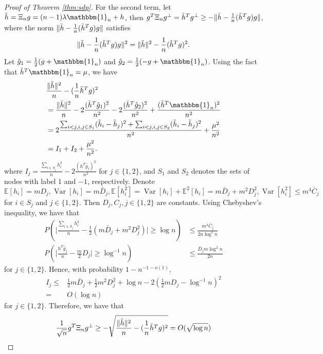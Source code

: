 \documentclass[conference]{IEEEtran}
\DeclarePairedDelimiter\norm{\lVert}{\rVert}
\DeclareMathOperator{\Var}{Var}
\begin{document}
\begin{proof}[Proof of Theorem \ref{thm:sdp}]
	For the second term, let $\tilde{h}=\Xi_n g
	=(n-1)\lambda\mathbbm{1}_n+h$, then
	$g^T \Xi_n g^{\perp} = \tilde{h}^T g^{\perp} \geq -\norm{\tilde{h}-\frac{1}{n}(\tilde{h}^Tg)g}$, where the  norm $\norm{\tilde{h}-\frac{1}{n}(\tilde{h}^Tg)g}$ satisfies
	\begin{align*}
		\norm{\tilde{h}-\frac{1}{n}(\tilde{h}^Tg)g}^2
		=\norm{\tilde{h}}^2 - \frac{1}{n}(\tilde{h}^Tg)^2.
	\end{align*}
	Let $\hat{g}_1 = \frac{1}{2}(g + \mathbbm{1}_n)$ and $\hat{g}_2 = \frac{1}{2}(-g +\mathbbm{1}_n)$.
	Using the fact that $\tilde{h}^T\mathbbm{1}_n=\mu$, we have 
	\begin{align*} 
		&\frac{\norm{\tilde{h}}^2}{n} - (\frac{1}{n}\tilde{h}^Tg)^2\\
		&=\frac{\norm{\tilde{h}}^2}{n} - 2\frac{(\tilde{h}^T \hat{g}_1)^2}{n^2} - 2\frac{(\tilde{h}^T \hat{g}_2)^2}{n^2} + \frac{(\tilde{h}^T\mathbbm{1}_n)^2}{n^2} \\
		&=2\frac{ \sum_{i<j,i,j\in S_1} (\tilde{h}_i - \tilde{h}_j)^2 + \sum_{i<j,i,j\in S_2} (\tilde{h}_i - \tilde{h}_j)^2 }{n^2}+ \frac{\mu^2}{n^2}\\
		& = I_1 + I_2 + \frac{\mu^2}{n^2}.
	\end{align*}
	where $I_j=\frac{\sum_{i\in S_j} h_i^2}{n} - 2\frac{(h^T \hat{g}_j)^2}{n^2}$ for $j\in\{1,2\}$,  and $S_1$ and $S_2$ denotes the sets of nodes with label $1$ and
	$-1$, respectively. Denote $\mathbb{E}[h_i]=m D_j, \Var[h_i]=m \bar{D}_j, \mathbb{E}[h_i^2]=\Var[h_i]+\mathbb{E}^2[h_i]=m \bar{D}_j+m^2 D^2_j, \Var[h_i^2] \leq m^4 \bar{C}_j$ for $i\in S_j$ and $j\in\{1,2\}$. Then
	$D_j, C_j,j\in\{1,2\}$ are constants.
	Using Chebyshev's inequality, we have that
	\begin{align*}
		P(\Big| \frac{\sum_{i\in S_j} h_i^2}{n} - \frac{1}{2}(m \bar{D}_j + m^2D_j^2) \Big| \geq \log n) & \leq \frac{m^4 \bar{C}_j}{2n\log^2 n} \\
		P(\Big| \frac{h^T \hat{g}_j}{n} - \frac{m}{2}D_j\Big| \geq \log^{-1} n) & \leq \frac{\bar{D}_j m \log^{2} n}{2n}
	\end{align*}
	for $j\in\{1,2\}$. Hence, with probability $1-n^{-1-o(1)}$, 
	\begin{align*}
		I_j \leq& \frac{1}{2}m\bar{D}_j + \frac{1}{2}m^2 D_j^2 + \log n - 2(\frac{1}{2}m D_j - \log^{-1} n)^2 \\
		=& O(\log n)
	\end{align*}
	for $j\in\{1,2\}$.
	Therefore, we have that
	$$
	\frac{1}{\sqrt{n}} g^T \Xi_n g^{\perp} \geq -\sqrt{\frac{\norm{\tilde{h}}^2}{n} - (\frac{1}{n}\tilde{h}^Tg)^2} = O(\sqrt{\log n})
	$$
 

\end{proof}
\end{document}
